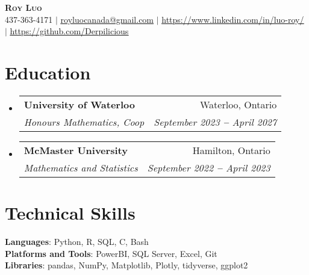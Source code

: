 \documentclass[letterpaper,11pt]{article}
\makeatletter
\newcommand{\resumeSubheading}[4]{
  \vspace{-2pt}\item
    \begin{tabular*}{0.97\textwidth}[t]{l@{\extracolsep{\fill}}r}
      \textbf{#1} & #2 \\
      \textit{\small#3} & \textit{\small #4} \\
    \end{tabular*}\vspace{-7pt}
}
\newcommand{\resumeSubHeadingListStart}{\begin{itemize}[leftmargin=0.15in, label={}]}
\newcommand{\resumeSubHeadingListEnd}{\end{itemize}}
\makeatother
\begin{document}

\begin{center}
    \textbf{\Huge \scshape Roy Luo} \\ \vspace{1pt}
    \small 437-363-4171 $|$ \href{mailto:royluocanada@gmail.com}{\underline{royluocanada@gmail.com}} $|$ 
    \href{https://linkedin.com/in/luo-roy/}{\underline{https://www.linkedin.com/in/luo-roy/}} $|$
    \href{https://github.com/Derpilicious}{\underline{https://github.com/Derpilicious}}
\end{center}
 
\section{Education}
  \resumeSubHeadingListStart
    \resumeSubheading
      {University of Waterloo}{Waterloo, Ontario}
      {Honours Mathematics, Coop}{September 2023 \textbf{--} April 2027}
    \resumeSubheading
      {McMaster University}{Hamilton, Ontario}
      {Mathematics and Statistics}{September 2022 \textbf{--} April 2023}
\resumeSubHeadingListEnd
      
\section{Technical Skills}
\begin{itemize}[leftmargin=0.15in, label={}]
   \small{\item{
    \textbf{Languages}{: Python, R, SQL, C, Bash} \\
    \textbf{Platforms and Tools}{: PowerBI, SQL Server, Excel, Git} \\
    \textbf{Libraries}{: pandas, NumPy, Matplotlib, Plotly, tidyverse, ggplot2} \\
   }}
 \end{itemize}
\end{document}
